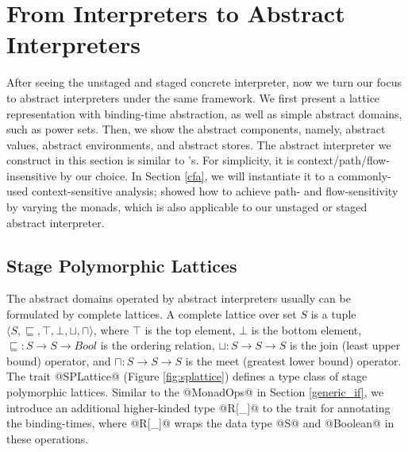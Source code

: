 \section{From Interpreters to Abstract Interpreters} \label{unstaged_abs}

After seeing the unstaged and staged concrete interpreter, now we turn our
focus to abstract interpreters under the same framework. We first present a
lattice representation with binding-time abstraction, as well as simple
abstract domains, such as power sets.  Then, we show the abstract
components, namely, abstract values, abstract environments, and abstract stores.
The abstract interpreter we construct in this section is similar to
\citet{DBLP:journals/pacmpl/DaraisLNH17}'s. For simplicity, it is
context/path/flow-insensitive by our choice. In Section \ref{cfa}, we will
instantiate it to a commonly-used context-sensitive analysis;
\citet{Darais:2015:GTM:2814270.2814308} showed how to achieve path- and
flow-sensitivity by varying the monads, which is also applicable to our
unstaged or staged abstract interpreter.

\subsection{Stage Polymorphic Lattices} \label{stagedpoly_lat}

The abstract domains operated by abstract interpreters usually can be
formulated by complete lattices.
A complete lattice over set $S$ is a tuple $\langle S, \sqsubseteq, \top,
\bot, \sqcup, \sqcap \rangle$, where $\top$ is the top element, $\bot$ is the
bottom element, $\sqsubseteq : S \to S \to Bool$ is the
ordering relation, $\sqcup: S \to S \to S$ is the join (least upper bound)
operator, and $\sqcap: S \to S \to S$ is the meet (greatest lower bound)
operator. The trait @SPLattice@ (Figure \ref{fig:splattice}) defines a type
class of stage polymorphic lattices. Similar to the @MonadOps@ in Section
\ref{generic_if}, we introduce an additional higher-kinded type @R[_]@ to the
trait for annotating the binding-times, where @R[_]@ wraps the data type
@S@ and @Boolean@ in these operations.

